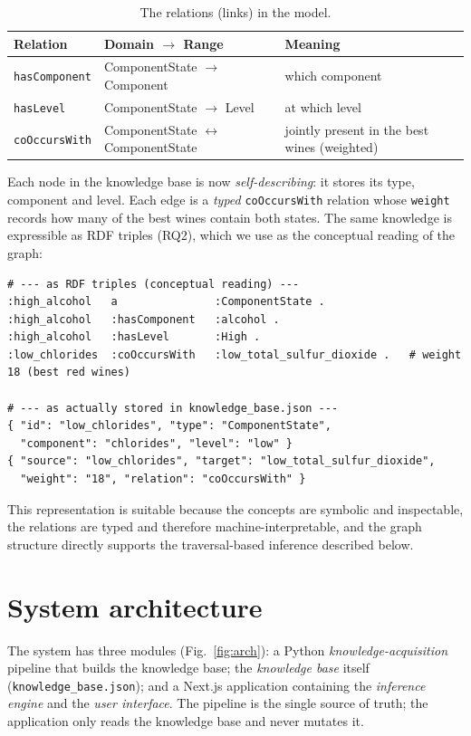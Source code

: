 \documentclass[12pt,a4paper]{article}
\begin{document}
	\begin{table}[h]
	\centering
	\begin{tabular}{@{}lll@{}}
	\toprule
	\textbf{Relation} & \textbf{Domain $\rightarrow$ Range} & \textbf{Meaning} \\
	\midrule
	\texttt{hasComponent} & ComponentState $\rightarrow$ Component & which component \\
	\texttt{hasLevel}     & ComponentState $\rightarrow$ Level     & at which level \\
	\texttt{coOccursWith} & ComponentState $\leftrightarrow$ ComponentState & jointly present in the best wines (weighted) \\
	\bottomrule
	\end{tabular}
	\caption{The relations (links) in the model.}
	\label{tab:relations}
	\end{table}

	Each node in the knowledge base is now \emph{self-describing}: it stores its
	type, component and level. Each edge is a \emph{typed} \texttt{coOccursWith}
	relation whose \texttt{weight} records how many of the best wines contain both
	states. The same knowledge is expressible as RDF triples (RQ2), which we use as
	the conceptual reading of the graph:

	\FloatBarrier
\begin{lstlisting}[caption={One node and one link, as triples and as stored JSON.},captionpos=b,label={lst:triples}]
# --- as RDF triples (conceptual reading) ---
:high_alcohol   a               :ComponentState .
:high_alcohol   :hasComponent   :alcohol .
:high_alcohol   :hasLevel       :High .
:low_chlorides  :coOccursWith   :low_total_sulfur_dioxide .   # weight 18 (best red wines)

# --- as actually stored in knowledge_base.json ---
{ "id": "low_chlorides", "type": "ComponentState",
  "component": "chlorides", "level": "low" }
{ "source": "low_chlorides", "target": "low_total_sulfur_dioxide",
  "weight": "18", "relation": "coOccursWith" }
\end{lstlisting}

	This representation is suitable because the concepts are symbolic and
	inspectable, the relations are typed and therefore machine-interpretable, and the
	graph structure directly supports the traversal-based inference described below.

	\section*{System architecture}
	The system has three modules (Fig.~\ref{fig:arch}): a Python
	\emph{knowledge-acquisition} pipeline that builds the knowledge base; the
	\emph{knowledge base} itself (\texttt{knowledge\_base.json}); and a Next.js
	application containing the \emph{inference engine} and the \emph{user interface}.
	The pipeline is the single source of truth; the application only reads the
	knowledge base and never mutates it.
\end{document}
